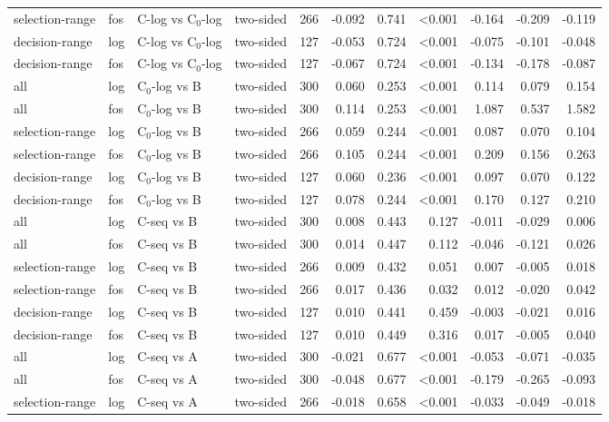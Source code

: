 \begin{longtable}{llllrrrrrrr}
selection-range & fos & C-log vs C$_0$-log & two-sided & 266 & -0.092 & 0.741 & <0.001 & -0.164 & -0.209 & -0.119 \\
decision-range & log & C-log vs C$_0$-log & two-sided & 127 & -0.053 & 0.724 & <0.001 & -0.075 & -0.101 & -0.048 \\
decision-range & fos & C-log vs C$_0$-log & two-sided & 127 & -0.067 & 0.724 & <0.001 & -0.134 & -0.178 & -0.087 \\
all & log & C$_0$-log vs B & two-sided & 300 & 0.060 & 0.253 & <0.001 & 0.114 & 0.079 & 0.154 \\
all & fos & C$_0$-log vs B & two-sided & 300 & 0.114 & 0.253 & <0.001 & 1.087 & 0.537 & 1.582 \\
selection-range & log & C$_0$-log vs B & two-sided & 266 & 0.059 & 0.244 & <0.001 & 0.087 & 0.070 & 0.104 \\
selection-range & fos & C$_0$-log vs B & two-sided & 266 & 0.105 & 0.244 & <0.001 & 0.209 & 0.156 & 0.263 \\
decision-range & log & C$_0$-log vs B & two-sided & 127 & 0.060 & 0.236 & <0.001 & 0.097 & 0.070 & 0.122 \\
decision-range & fos & C$_0$-log vs B & two-sided & 127 & 0.078 & 0.244 & <0.001 & 0.170 & 0.127 & 0.210 \\
all & log & C-seq vs B & two-sided & 300 & 0.008 & 0.443 & 0.127 & -0.011 & -0.029 & 0.006 \\
all & fos & C-seq vs B & two-sided & 300 & 0.014 & 0.447 & 0.112 & -0.046 & -0.121 & 0.026 \\
selection-range & log & C-seq vs B & two-sided & 266 & 0.009 & 0.432 & 0.051 & 0.007 & -0.005 & 0.018 \\
selection-range & fos & C-seq vs B & two-sided & 266 & 0.017 & 0.436 & 0.032 & 0.012 & -0.020 & 0.042 \\
decision-range & log & C-seq vs B & two-sided & 127 & 0.010 & 0.441 & 0.459 & -0.003 & -0.021 & 0.016 \\
decision-range & fos & C-seq vs B & two-sided & 127 & 0.010 & 0.449 & 0.316 & 0.017 & -0.005 & 0.040 \\
all & log & C-seq vs A & two-sided & 300 & -0.021 & 0.677 & <0.001 & -0.053 & -0.071 & -0.035 \\
all & fos & C-seq vs A & two-sided & 300 & -0.048 & 0.677 & <0.001 & -0.179 & -0.265 & -0.093 \\
selection-range & log & C-seq vs A & two-sided & 266 & -0.018 & 0.658 & <0.001 & -0.033 & -0.049 & -0.018 \\

\end{longtable}
